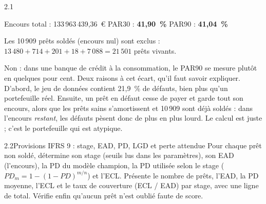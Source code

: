 \begin{correction}{2.1}
\begin{resultat}
\begin{center}
\smallskip
Encours total : 133\,963\,439,36~€ \qquad PAR30 : \textbf{41,90~\%} \qquad PAR90 : \textbf{41,04~\%}
\end{center}
Les 10\,909 prêts soldés (encours nul) sont exclus : $13\,480 + 714 + 201 + 18 + 7\,088 = 21\,501$ prêts
vivants.
\end{resultat}

\begin{observation}
Non : dans une banque de crédit à la consommation, le PAR90 se mesure plutôt en quelques pour cent.
Deux raisons à cet écart, qu'il faut savoir expliquer. D'abord, le jeu de données contient 21,9~\% de
défauts, bien plus qu'un portefeuille réel. Ensuite, un prêt en défaut cesse de payer et garde tout son
encours, alors que les prêts sains s'amortissent et 10\,909 sont déjà soldés : dans l'encours
\emph{restant}, les défauts pèsent donc de plus en plus lourd. Le calcul est juste ; c'est le
portefeuille qui est atypique.
\end{observation}
\end{correction}

\begin{exercice}{2.2}{Provisions IFRS 9 : stage, EAD, PD, LGD et perte attendue}
Pour chaque prêt non soldé, détermine son stage (seuils lus dans les paramètres), son EAD (l'encours),
la PD du modèle champion, la PD utilisée selon le stage ($PD_m = 1-(1-PD)^{m/n}$) et l'ECL. Présente le
nombre de prêts, l'EAD, la PD moyenne, l'ECL et le taux de couverture (ECL / EAD) par stage, avec une
ligne de total. Vérifie enfin qu'aucun prêt n'est oublié faute de score.
\end{exercice}

